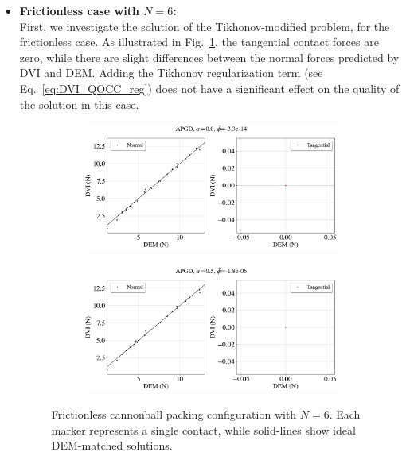 \begin{itemize}
	\item 	\textbf{Frictionless case with $N=6$:}\\
	First, we investigate the solution of the Tikhonov-modified problem, for the frictionless case. As illustrated in Fig.~\ref{fig:cbp_mu0}, the tangential contact forces are zero, while there are slight differences between the normal forces predicted by DVI and DEM. Adding the Tikhonov regularization term (see Eq.~\ref{eq:DVI_QOCC_reg}) does not have a significant effect on the quality of the solution in this case.
	\begin{figure}[H]
		\centering	
		\begin{subfigure}{0.9\columnwidth}	
			\centering
			\includegraphics[width=1.0\textwidth]{images/CD/Example7/4_DVI_APGD_al_0_mu0.png}
		\end{subfigure}
		
		\begin{subfigure}{0.9\columnwidth}	
			\centering
			\includegraphics[width=1.0\textwidth]{images/CD/Example7/7_DVI_APGD_al_05_mu0.png}
		\end{subfigure}
		\caption{Frictionless cannonball packing configuration with $N=6$. Each marker represents a single contact, while solid-lines show ideal DEM-matched solutions.}\label{fig:cbp_mu0}
	\end{figure}
	

\end{itemize}
